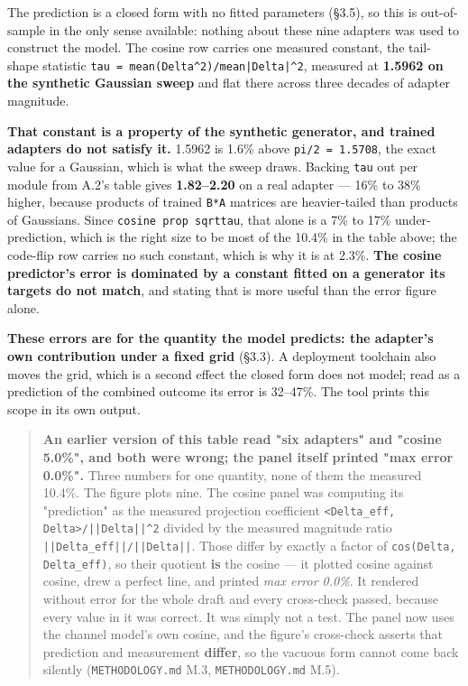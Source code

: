 The prediction is a closed form with no fitted parameters (\S{}3.5), so this is out-of-sample in the only sense available: nothing about these nine adapters was used to construct the model. The cosine row carries one measured constant, the tail-shape statistic \texttt{tau = mean(Delta\textasciicircum{}2)/\allowbreak{}mean|Delta|\textasciicircum{}2}, measured at \textbf{1.5962 on the synthetic Gaussian sweep} and flat there across three decades of adapter magnitude.

\textbf{That constant is a property of the synthetic generator, and trained adapters do not satisfy it.} 1.5962 is 1.6\% above \texttt{pi/\allowbreak{}2 = 1.\allowbreak{}5708}, the exact value for a Gaussian, which is what the sweep draws. Backing \texttt{tau} out per module from A.2's table gives \textbf{1.82--2.20} on a real adapter --- 16\% to 38\% higher, because products of trained \texttt{B*A} matrices are heavier-tailed than products of Gaussians. Since \texttt{cosine prop sqrttau}, that alone is a 7\% to 17\% under-prediction, which is the right size to be most of the 10.4\% in the table above; the code-flip row carries no such constant, which is why it is at 2.3\%. \textbf{The cosine predictor's error is dominated by a constant fitted on a generator its targets do not match}, and stating that is more useful than the error figure alone.

\textbf{These errors are for the quantity the model predicts: the adapter's own contribution under a fixed grid} (\S{}3.3). A deployment toolchain also moves the grid, which is a second effect the closed form does not model; read as a prediction of the combined outcome its error is 32--47\%. The tool prints this scope in its own output.

\begin{quote}\small
\textbf{An earlier version of this table read "six adapters" and "cosine 5.0\%", and both were wrong; the panel itself printed "max error 0.0\%".} Three numbers for one quantity, none of them the measured 10.4\%. The figure plots nine. The cosine panel was computing its "prediction" as the measured projection coefficient \texttt{<Delta\_\allowbreak{}eff, Delta>/\allowbreak{}||Delta||\textasciicircum{}2} divided by the measured magnitude ratio \texttt{||Delta\_\allowbreak{}eff||/\allowbreak{}||Delta||}. Those differ by exactly a factor of \texttt{cos(Delta, Delta\_\allowbreak{}eff)}, so their quotient \textbf{is} the cosine --- it plotted cosine against cosine, drew a perfect line, and printed \emph{max error 0.0\%}. It rendered without error for the whole draft and every cross-check passed, because every value in it was correct. It was simply not a test. The panel now uses the channel model's own cosine, and the figure's cross-check asserts that prediction and measurement \textbf{differ}, so the vacuous form cannot come back silently (\texttt{METHODOLOGY.\allowbreak{}md} M.3, \texttt{METHODOLOGY.\allowbreak{}md} M.5).
\end{quote}

